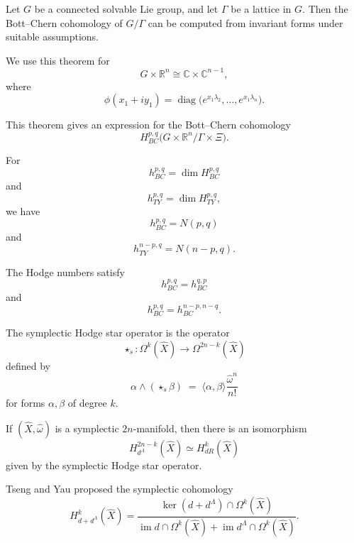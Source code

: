 \begin{theorem}
\label{theorem-angella-kasuya}
Let $G$ be a connected solvable Lie
group, and let $\Gamma$ be a lattice
in $G$.
Then the Bott--Chern cohomology of
\(G/\Gamma\) can be computed from
invariant forms under suitable
assumptions.
\end{theorem}

\medskip\noindent
We use this theorem for
$$
G\times\mathbb{R}^n
\cong
\mathbb{C}\times\mathbb{C}^{n-1},
$$
where
$$
\phi(x_1+iy_1)
=\operatorname{diag}
\bigl(
e^{x_1\lambda_2},
\dots,
e^{x_1\lambda_n}
\bigr).
$$

\begin{theorem}
\label{theorem-bc-computation}
This theorem gives an expression for
the Bott--Chern cohomology
$$
H^{p,q}_{BC}
\bigl(
G\times\mathbb{R}^n
/
\Gamma\times\Xi
\bigr).
$$
\end{theorem}

\begin{lemma}
\label{lemma-bc-ty-dimensions}
For
$$
h^{p,q}_{BC}
=\dim H^{p,q}_{BC}
$$
and
$$
h^{p,q}_{TY}
=\dim H^{p,q}_{TY},
$$
we have
$$
h^{p,q}_{BC}=N(p,q)
$$
and
$$
h^{n-p,q}_{TY}=N(n-p,q).
$$
\end{lemma}

\begin{lemma}
\label{lemma-hodge-number-relations}
The Hodge numbers satisfy
$$
h^{p,q}_{BC}=h^{q,p}_{BC}
$$
and
$$
h^{p,q}_{BC}=h^{n-p,n-q}_{BC}.
$$
\end{lemma}

\begin{definition}
\label{definition-symplectic-hodge-star}
The symplectic Hodge star operator
is the operator
$$
\star_s:\Omega^k(\widehat X)\to
\Omega^{2n-k}(\widehat X)
$$
defined by
$$
\alpha\wedge(\star_s\beta)
\;=\;
\langle \alpha,\beta\rangle
\frac{\widehat\omega^n}{n!}
$$
for forms $\alpha,\beta$ of degree
$k$.
\end{definition}

\begin{theorem}[Brylinski]
\label{theorem-brylinski}
If $(\widehat X,\widehat\omega)$ is a
symplectic $2n$-manifold, then there
is an isomorphism
$$
H^{2n-k}_{d^\Lambda}(\widehat X)
\simeq
H^k_{dR}(\widehat X)
$$
given by the symplectic Hodge star
operator.
\end{theorem}

\begin{definition}
\label{definition-tseng-yau-dplus}
Tseng and Yau proposed the symplectic
cohomology
$$
H^k_{d+d^\Lambda}(\widehat X)
=\frac{
\ker(d+d^\Lambda)\cap\Omega^k(\widehat X)
}{
\operatorname{im}d\cap\Omega^k(\widehat X)
+\operatorname{im}d^\Lambda\cap
\Omega^k(\widehat X)
}.
$$
\end{definition}

